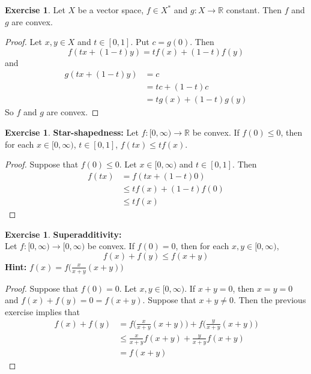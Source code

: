 \documentclass[12pt]{amsart}
\theoremstyle{definition}
\newtheorem{ex}[definition]{Exercise}
\newcommand{\R}{\mathbb{R}}
\newcommand{\tbf}[1]{\textbf{#1}}
\newcommand{\ui}{[0,1]}
\newcommand{\Rg}{[0,\infty)}
\DeclareMathOperator*{\0}{\mbf{0}}
\DeclareMathOperator*{\1}{\mbf{1}}
\newcommand{\lex}[1]{\label{ex:#1}}
\begin{document}
	\begin{ex} \lex{91004}
	Let $X$ be a vector space, $f \in X^*$ and $g: X \rightarrow \R$ constant. Then $f$ and $g$ are convex. 
	\end{ex}
	
	\begin{proof}
		Let $x, y \in X$ and $t \in \ui$. Put $c = g(0)$. Then $$f(tx + (1-t)y) = tf(x) + (1-t)f(y)$$ and 
		\begin{align*}
		g(tx + (1-t)y) 
		&= c\\ 
		&= tc + (1-t)c \\
		&= tg(x) + (1-t)g(y)
		\end{align*}
		So $f$ and $g$ are convex.
	\end{proof}		

	\begin{ex} \tbf{Star-shapedness:}
		Let $f:\Rg \rightarrow \R$ be convex. If $f(0) \leq 0$, then for each $x \in \Rg$, $t \in [0,1]$, $f(tx) \leq tf(x)$.
	\end{ex}

	\begin{proof}
		Suppose that $f(0) \leq 0$. Let $x \in \Rg$ and $t \in [0,1]$. Then 
		\begin{align*}
			f(tx)
			&= f(tx + (1-t)0) \\
			& \leq tf(x) + (1-t)f(0) \\
			& \leq tf(x)
		\end{align*}
	\end{proof}

	\begin{ex} \tbf{Superadditivity:}\\
		Let $f:\Rg \rightarrow \Rg$ be convex. If $f(0) = 0$, then for each $x,y \in \Rg$, $$f(x) + f(y) \leq f(x+y)$$
		\tbf{Hint:} $f(x) = f \bigg( \frac{x}{x+y}(x+y)\bigg)$
	\end{ex}

	\begin{proof}
		Suppose that $f(0) = 0$. Let $x, y \in \Rg$. If $x+y = 0$, then $x=y=0$ and $f(x) + f(y) = 0 = f(x+y)$. Suppose that $x+y \neq 0$. Then the previous exercise implies that 
		\begin{align*}
			f(x) + f(y) 
			&= f \bigg( \frac{x}{x+y}(x+y)\bigg) + f \bigg( \frac{y}{x+y}(x+y)\bigg) \\
			& \leq \frac{x}{x+y}f(x+y) + \frac{y}{x+y}f(x+y) \\
			&= f(x+y)
		\end{align*}
	\end{proof}
	
\end{document}
